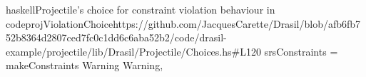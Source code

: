 \begin{codeSnippet}{haskell}{Projectile's choice for constraint violation behaviour in code}{projViolationChoice}{https://github.com/JacquesCarette/Drasil/blob/afb6fb752b8364d2807ced7fc0c1dd6c6aba52b2/code/drasil-example/projectile/lib/Drasil/Projectile/Choices.hs\#L120}
    srsConstraints = makeConstraints Warning Warning,
\end{codeSnippet}
